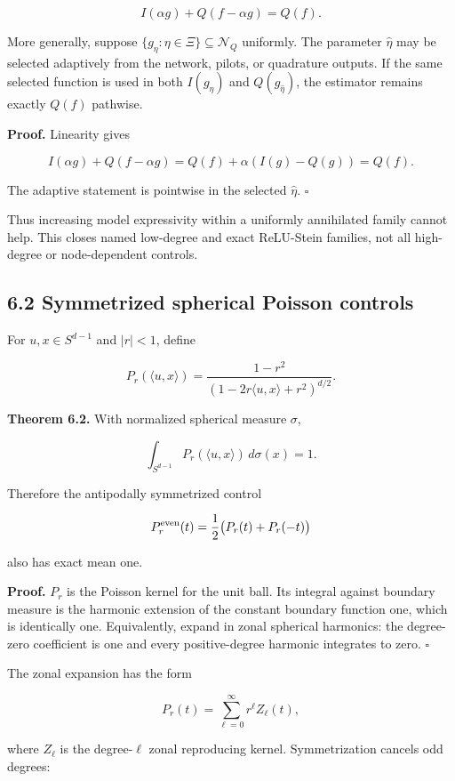 \documentclass[
  10pt,
]{article}
\begin{document}
\[
I(\alpha g)+Q(f-\alpha g)=Q(f).
\]

More generally, suppose \(\{g_\eta:\eta\in\Xi\}\subseteq\mathcal N_Q\)
uniformly. The parameter \(\widehat\eta\) may be selected adaptively
from the network, pilots, or quadrature outputs. If the same selected
function is used in both \(I(g_{\widehat\eta})\) and
\(Q(g_{\widehat\eta})\), the estimator remains exactly \(Q(f)\)
pathwise.

\textbf{Proof.} Linearity gives

\[
I(\alpha g)+Q(f-\alpha g)
=Q(f)+\alpha(I(g)-Q(g))
=Q(f).
\]

The adaptive statement is pointwise in the selected \(\widehat\eta\).
\(\square\)

Thus increasing model expressivity within a uniformly annihilated family
cannot help. This closes named low-degree and exact ReLU-Stein families,
not all high-degree or node-dependent controls.

\subsection{6.2 Symmetrized spherical Poisson
controls}\label{symmetrized-spherical-poisson-controls}

For \(u,x\in S^{d-1}\) and \(|r|<1\), define

\[
P_r(\langle u,x\rangle)
=
\frac{1-r^2}
{(1-2r\langle u,x\rangle+r^2)^{d/2}}.
\]

\textbf{Theorem 6.2.} With normalized spherical measure \(\sigma\),

\[
\int_{S^{d-1}}P_r(\langle u,x\rangle)\,d\sigma(x)=1.
\]

Therefore the antipodally symmetrized control

\[
P_r^{\rm even}(t)
=
\frac12\bigl(P_r(t)+P_r(-t)\bigr)
\]

also has exact mean one.

\textbf{Proof.} \(P_r\) is the Poisson kernel for the unit ball. Its
integral against boundary measure is the harmonic extension of the
constant boundary function one, which is identically one. Equivalently,
expand in zonal spherical harmonics: the degree-zero coefficient is one
and every positive-degree harmonic integrates to zero. \(\square\)

The zonal expansion has the form

\[
P_r(t)=\sum_{\ell=0}^{\infty}r^\ell Z_\ell(t),
\]

where \(Z_\ell\) is the degree-\(\ell\) zonal reproducing kernel.
Symmetrization cancels odd degrees:
\end{document}
